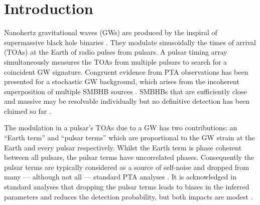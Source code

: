 \documentclass[fleqn,usenatbib,useAMS]{mnras}
\begin{document}
\section{Introduction}\label{sec:intro}
Nanohertz gravitational waves (GWs) are produced by the inspiral of supermassive black hole binaries \citep[SMBHBs;][]{Rajagopal1995,Jaffe_2003, Wyithe2003,Sesana2013,McWilliams_2014,Ravi2015MNRAS.447.2772R,Burke2019, Skyes2022}. They modulate sinusoidally the times of arrival (TOAs) at the Earth of radio pulses from pulsars. A pulsar timing array \citep[PTA;][]{ Tiburzi2018, 2021hgwa.bookE...4V} simultaneously measures the TOAs from multiple pulsars to search for a coincident GW signature. Congruent evidence from PTA observations has been presented \citep{2023ApJ...951L...8A,2023arXiv230616214A,2023ApJ...951L...6R,2023RAA....23g5024X} for a stochastic GW background, which arises from the incoherent superposition of multiple SMBHB sources \citep{Allen1997,Sesana10,Christensen2019,Renzini2022}. SMBHBs that are sufficiently close and massive may be resolvable individually but no definitive detection has been claimed so far \citep{Jenet2004,Zhu2014PPTA,Babak2016,Arzoumanian2023,2023arXiv230616226A}. \newline 

The modulation in a pulsar's TOAs due to a GW has two contributions: an ``Earth term'' and ``pulsar terms'' which are proportional to the GW strain at the Earth and every pulsar respectively. Whilst the Earth term is phase coherent between all pulsars, the pulsar terms have uncorrelated phases. Consequently the pulsar terms are typically considered as a source of self-noise and dropped from many --- although not all --- standard PTA analyses \citep[e.g.][]{Sesana2010,Babak2012,Petiteau2013,Zhu2015,Taylors2016,Goldstein2018,Charisi2023arXiv230403786C}. It is acknowledged in standard analyses that dropping the pulsar terms leads to biases in the inferred parameters and reduces the detection probability, but both impacts are modest \citep{Zhupulsarterms,Chen2022,KimpsonPTA}. \newline 
\end{document}
